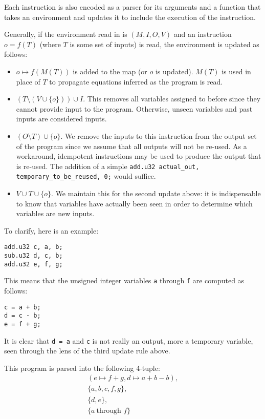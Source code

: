 \documentclass[letterpaper,twocolumn,10pt]{article}
\begin{document}
Each instruction is also encoded as a parser for its arguments
and a function that takes an environment and updates it to
include the execution of the instruction.

Generally, if the environment read in is $(M, I, O, V)$ and
an instruction $o = f(T)$ (where $T$ is some set of inputs)
is read, the environment is updated as follows:
\begin{itemize}
    \item $o \mapsto f(M(T))$ is added to the map (or $o$ is updated).
        $M(T)$ is used in place of $T$ to propagate equations inferred
        as the program is read.
    \item $(T \setminus (V \cup \{o\})) \cup I$.
        This removes all variables assigned to before since they
        cannot provide input to the program. Otherwise, unseen variables
        and past inputs are considered inputs.
    \item $(O \setminus T) \cup \{o\}$.
        We remove the inputs to this instruction from the output set of
        the program since we assume that all outputs will not be re-used.
        As a workaround, idempotent instructions may be used to produce the
        output that is re-used. The addition of a simple \texttt{add.u32 actual\_out, temporary\_to\_be\_reused, 0;} would suffice.
    \item $V \cup T \cup \{o\}$.
        We maintain this for the second update above: it is indispensable to
        know that variables have actually been seen in order to determine
        which variables are new inputs.
\end{itemize}

To clarify, here is an example:
\begin{lstlisting}
add.u32 c, a, b;
sub.u32 d, c, b;
add.u32 e, f, g;
\end{lstlisting}
This means that the unsigned integer variables
\texttt{a} through \texttt{f} are computed as follows:
\begin{lstlisting}
c = a + b;
d = c - b;
e = f + g;
\end{lstlisting}
It is clear that \texttt{d = a} and \texttt{c} is not really an
output, more a temporary variable, seen through the lens of the third update
rule above.

This program is parsed into the following 4-tuple:
\begin{align*}
    (e \mapsto f + g, d \mapsto a + b - b), \\
    \{a, b, c, f, g\}, \\
    \{d, e\}, \\
    \{a\ \text{through } f\}
\end{align*}
\end{document}
